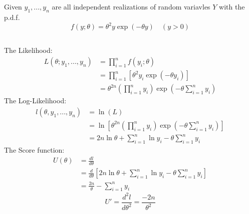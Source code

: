 \documentclass[a4paper]{article}
\begin{document}



\section{}
	Given \(y_1, ... , y_n\) are all independent realizations of random variavles \(Y\) with the p.d.f.
		\[f(y;\theta) = \theta^2 y \exp(-\theta y) \quad (y > 0)\]
	
	\subsection{}
		The Likelihood:
			\begin{equation*}
				\begin{split}
					L(\theta; y_1,...,y_n) &= \prod_{i=1}^n f(y_i; \theta)\\
					&= \prod_{i=1}^n \left[\theta^2 y_i \exp(-\theta y_i) \right]\\
					&= \theta^{2n} \left(\prod_{i=1}^n y_i \right) \exp\left(-\theta\sum_{i=1}^ny_i \right)
				\end{split}
			\end{equation*}
		The Log-Likelihood:
			\begin{equation*}
				\begin{split}
					l(\theta, y_1,...,y_n) &= \ln(L)\\
					&= \ln \left[\theta^{2n} \left(\prod_{i=1}^n y_i \right) \exp\left(-\theta\sum_{i=1}^ny_i \right)\right]\\
					&= 2n\ln\theta + {\sum_{i=1}^n \ln y_i} - \theta {\sum_{i=1}^n y_i}
				\end{split}
			\end{equation*}
		The Score function:
			\begin{equation*}
				\begin{split}
					U(\theta) &= \frac{dl}{d\theta}\\
					&= \frac{d}{d\theta} \left[2n\ln\theta + {\sum_{i=1}^n \ln y_i} - \theta {\sum_{i=1}^n y_i}\right]\\
					&= \frac{2n}{\theta} - \sum_{i=1}^n y_i
				\end{split}
			\end{equation*}
			\begin{equation*}
				U' = \frac{d^2l}{d\theta^2} = \frac{-2n}{\theta^2}
			\end{equation*}
\end{document}
